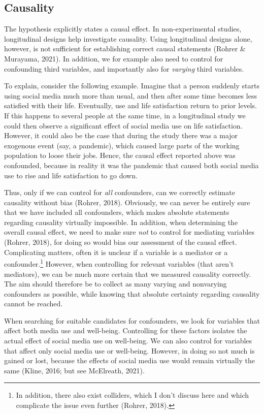 \documentclass[
  english,
  man,mask,floatsintext]{apa6}
\begin{document}
\hypertarget{causality}{%
\subsection{Causality}\label{causality}}

The hypothesis explicitly states a causal effect.
In non-experimental studies, longitudinal designs help investigate causality.
Using longitudinal designs alone, however, is not sufficient for establishing correct causal statements (Rohrer \& Murayama, 2021).
In addition, we for example also need to control for confounding third variables, and importantly also for \emph{varying} third variables.

To explain, consider the following example.
Imagine that a person suddenly starts using social media much more than usual, and then after some time becomes less satisfied with their life.
Eventually, use and life satisfaction return to prior levels.
If this happens to several people at the same time, in a longitudinal study we could then observe a significant effect of social media use on life satisfaction.
However, it could also be the case that during the study there was a major exogenous event (say, a pandemic), which caused large parts of the working population to loose their jobs.
Hence, the causal effect reported above was confounded, because in reality it was the pandemic that caused both social media use to rise and life satisfaction to go down.

Thus, only if we can control for \emph{all} confounders, can we correctly estimate causality without bias (Rohrer, 2018).
Obviously, we can never be entirely sure that we have included all confounders, which makes absolute statements regarding causality virtually impossible.
In addition, when determining the overall causal effect, we need to make sure \emph{not} to control for mediating variables (Rohrer, 2018), for doing so would bias our assessment of the causal effect.
Complicating matters, often it is unclear if a variable is a mediator or a confounder.\footnote{In addition, there also exist colliders, which I don't discuss here and which complicate the issue even further (Rohrer, 2018).}
However, when controlling for relevant variables (that aren't mediators), we can be much more certain that we measured causality correctly.
The aim should therefore be to collect as many varying and nonvarying confounders as possible, while knowing that absolute certainty regarding causality cannot be reached.

When searching for suitable candidates for confounders, we look for variables that affect both media use and well-being.
Controlling for these factors isolates the actual effect of social media use on well-being.
We can also control for variables that affect only social media use or well-being.
However, in doing so not much is gained or lost, because the effects of social media use would remain virtually the same (Kline, 2016; but see McElreath, 2021).
\end{document}
